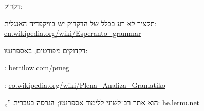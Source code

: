 




דקדוק:
\begin{compactitem}
\item תקציר לא רע בכלל של הדקדוק יש בוויקפדיה האנגלית: \url{en.wikipedia.org/wiki/Esperanto_grammar}
\item דקדוקים מפורטים, באספרנטו:
	\begin{compactitem}
	\item {}: \url{bertilow.com/pmeg}
	\item {}: \url{eo.wikipedia.org/wiki/Plena_Analiza_Gramatiko}
	\end{compactitem}
\item „” הוא אתר רב־לשוני ללימוד אספרנטו; הגרסה בעברית: \url{he.lernu.net}
\end{compactitem}

